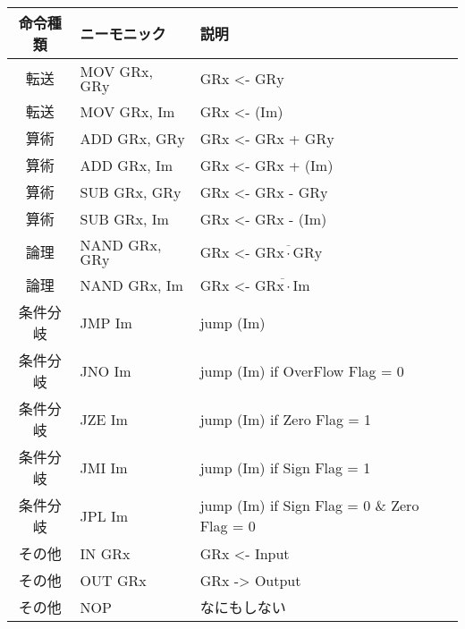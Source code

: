 \documentclass[lualatex,js=standard,hiresbb,openany]{bxjsarticle}
\begin{document}
\begin{table}[H]
 \begin{center}
  \begin{tabular}{cll}\hline
    命令種類 & ニーモニック & 説明 \\ 
    \hline \hline
    転送     & MOV  $\mathrm{GRx}$, $\mathrm{GRy}$        & $\mathrm{GRx}$ <- $\mathrm{GRy}$ \\ 
    転送     & MOV  $\mathrm{GRx}$, Im                    & $\mathrm{GRx}$ <- (Im)\\
    算術     & ADD  $\mathrm{GRx}$, $\mathrm{GRy}$        & $\mathrm{GRx}$ <- $\mathrm{GRx}$ + $\mathrm{GRy}$ \\ 
    算術     & ADD  $\mathrm{GRx}$, Im                    & $\mathrm{GRx}$ <- $\mathrm{GRx}$ + (Im) \\
    算術     & SUB  $\mathrm{GRx}$, $\mathrm{GRy}$        & $\mathrm{GRx}$ <- $\mathrm{GRx}$ - $\mathrm{GRy}$\\ 
    算術     & SUB  $\mathrm{GRx}$, Im                    & $\mathrm{GRx}$ <- $\mathrm{GRx}$ - (Im) \\
    論理     & NAND $\mathrm{GRx}$, $\mathrm{GRy}$        & $\mathrm{GRx}$ <- $\overline{\mathrm{GRx \cdot GRy}}$ \\
    論理     & NAND $\mathrm{GRx}$, Im                    & $\mathrm{GRx}$ <- $\overline{\mathrm{GRx \cdot Im}}$ \\
    条件分岐 & JMP  Im                                    & jump (Im) \\
    条件分岐 & JNO  Im                                    & jump (Im) if OverFlow Flag = 0 \\
    条件分岐 & JZE  Im                                    & jump (Im) if Zero Flag = 1 \\
    条件分岐 & JMI  Im                                    & jump (Im) if Sign Flag = 1\\
    条件分岐 & JPL  Im                                    & jump (Im) if Sign Flag = 0 \& Zero Flag = 0 \\
    その他   & IN   $\mathrm{GRx}$                        & $\mathrm{GRx}$ <- Input \\
    その他   & OUT  $\mathrm{GRx}$                        & $\mathrm{GRx}$ -> Output \\
    その他   & NOP                                        & なにもしない \\
     \hline
  \end{tabular}
  \label{tab:}
 \end{center}
\end{table}
\end{document}
